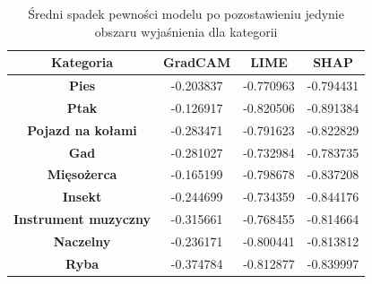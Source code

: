 \begin{table}[h]
	\centering
	\begin{tabular}{|c|c|c|c|}
		\hline
		\textbf{Kategoria}           & \textbf{GradCAM} & \textbf{LIME} & \textbf{SHAP} \\
		\hline
		\textbf{Pies}                & -0.203837        & -0.770963     & -0.794431     \\
		\hline
		\textbf{Ptak}                & -0.126917        & -0.820506     & -0.891384     \\
		\hline
		\textbf{Pojazd na kołami}    & -0.283471        & -0.791623     & -0.822829     \\
		\hline
		\textbf{Gad}                 & -0.281027        & -0.732984     & -0.783735     \\
		\hline
		\textbf{Mięsożerca}          & -0.165199        & -0.798678     & -0.837208     \\
		\hline
		\textbf{Insekt}              & -0.244699        & -0.734359     & -0.844176     \\
		\hline
		\textbf{Instrument muzyczny} & -0.315661        & -0.768455     & -0.814664     \\
		\hline
		\textbf{Naczelny}            & -0.236171        & -0.800441     & -0.813812     \\
		\hline
		\textbf{Ryba}                & -0.374784        & -0.812877     & -0.839997     \\
		\hline
	\end{tabular}
	\caption{Średni spadek pewności modelu po pozostawieniu jedynie obszaru wyjaśnienia dla kategorii}
	\label{tab:category_confidence_exp}
\end{table}


